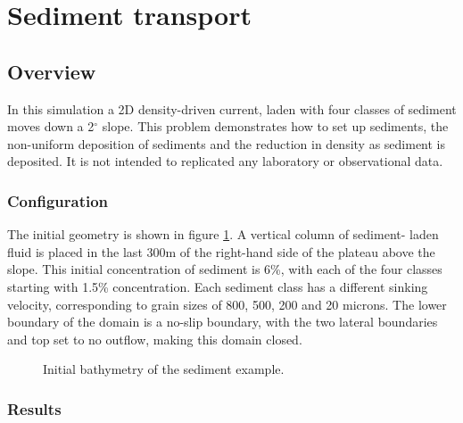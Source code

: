 
\section{Sediment transport}
\label{sect:sediment_transport}

\subsection{Overview}

In this simulation a 2D density-driven current, laden with four classes of sediment
moves down a 2$^{\circ}$ slope. This problem demonstrates how to set up sediments, 
the non-uniform deposition of sediments and the reduction in density as sediment is
deposited. It is not intended to replicated any laboratory or observational data.

\subsubsection{Configuration}

The initial geometry is shown in figure \ref{Fig:sediment:bathymetry}. A vertical column of sediment-
laden fluid is placed in the last 300m of the right-hand side of the plateau above the slope. 
This initial concentration of sediment is 6\%, with each of the four classes starting with
1.5\% concentration. Each sediment class has a different sinking velocity, corresponding to 
grain sizes of 800, 500, 200 and 20 microns. The lower boundary of the domain is a 
no-slip boundary, with the two lateral boundaries and top set to no outflow, making this domain closed.

\begin{figure}[ht]
  \centering
  \caption{Initial bathymetry of the sediment example.}
  \label{Fig:sediment:bathymetry}
\end{figure}

\subsubsection{Results}

